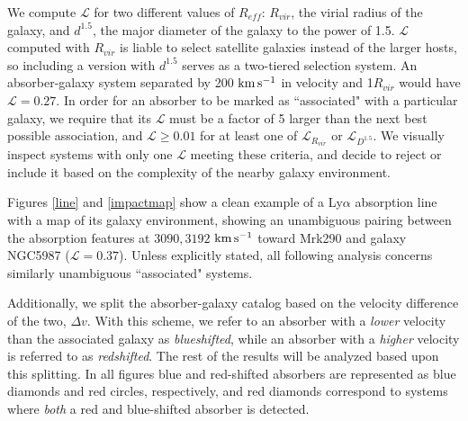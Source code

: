 \documentclass[twocolumn,tighten]{aastex6}
\begin{document}
We compute $\mathcal{L}$ for two different values of $R_{eff}$: $R_{vir}$, the virial radius of the galaxy, and $d^{1.5}$, the major diameter of the galaxy to the power of 1.5. $\mathcal{L}$ computed with $R_{vir}$ is liable to select satellite galaxies instead of the larger hosts, so including a version with $d^{1.5}$ serves as a two-tiered selection system. An absorber-galaxy system separated by 200 $\rm km\, s^{-1}$ in velocity and 1$R_{vir}$ would have $\mathcal{L} = 0.27$. In order for an absorber to be marked as ``associated" with a particular galaxy, we require that its $\mathcal{L}$ must be a factor of 5 larger than the next best possible association, and $\mathcal{L} \ge 0.01$ for at least one of $\mathcal{L}_{R_{vir}}$ or $\mathcal{L}_{D^{1.5}}$. We visually inspect systems with only one $\mathcal{L}$ meeting these criteria, and decide to reject or include it based on the complexity of the nearby galaxy environment. 

Figures \ref{line} and \ref{impactmap} show a clean example of a Ly$\alpha$ absorption line with a map of its galaxy environment, showing an unambiguous pairing between the absorption features at $3090, 3192$ $\rm km\, s^{-1}$ toward Mrk290 and galaxy NGC5987 ($\mathcal{L} = 0.37$). Unless explicitly stated, all following analysis concerns similarly unambiguous ``associated" systems. 

Additionally, we split the absorber-galaxy catalog based on the velocity difference of the two, $\Delta v$. With this scheme, we refer to an absorber with a \textit{lower} velocity than the associated galaxy as \textit{blueshifted}, while an absorber with a \textit{higher} velocity is referred to as \textit{redshifted}. The rest of the results will be analyzed based upon this splitting. In all figures blue and red-shifted absorbers are represented as blue diamonds and red circles, respectively, and red diamonds correspond to systems where \textit{both} a red and blue-shifted absorber is detected.
\end{document}
